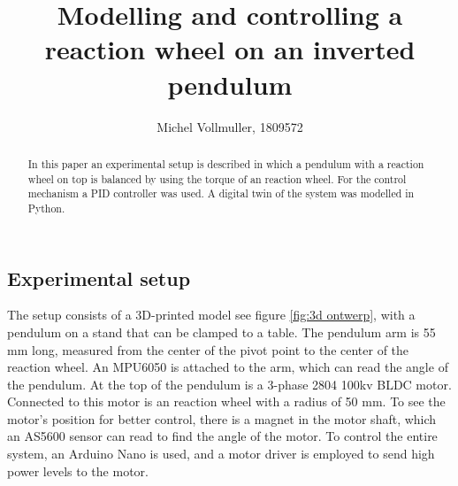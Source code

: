 \documentclass{article}
\title{Modelling and controlling a reaction wheel on an inverted pendulum}
\author{Michel Vollmuller, 1809572}
\begin{document}
\maketitle

\begin{abstract}

In this paper an experimental setup is described in which a pendulum with a reaction wheel on top is balanced by using the torque of an reaction wheel. For the control mechanism a PID controller was used. A digital twin of the system was modelled in Python.\end{abstract}

\begin{multicols}{2}

\section{Experimental setup}

The setup consists of a 3D-printed model see figure \ref{fig:3d ontwerp}, with a pendulum on a stand that can be clamped to a table. The pendulum arm is 55 mm long, measured from the center of the pivot point to the center of the reaction wheel. An MPU6050 is attached to the arm, which can read the angle of the pendulum. At the top of the pendulum is a 3-phase 2804 100kv BLDC motor. Connected to this motor is an reaction wheel with a radius of 50 mm. To see the motor's position for better control, there is a magnet in the motor shaft, which an AS5600 sensor can read to find the angle of the motor.
To control the entire system, an Arduino Nano is used, and a motor driver is employed to send high power levels to the motor.



\end{multicols}
\end{document}
